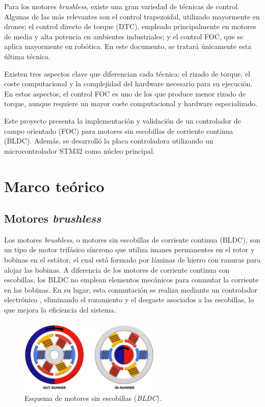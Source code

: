 \documentclass[11pt]{report}
\begin{document}
Para los motores \textit{brushless}, existe una gran variedad de técnicas de control. Algunas de las más relevantes son el control trapezoidal, utilizado mayormente en drones; el control directo de torque (DTC), empleado principalmente en motores de media y alta potencia en ambientes industriales; y el control FOC, que se aplica mayormente en robótica. En este documento, se tratará únicamente esta última técnica.

Existen tres aspectos clave que diferencian cada técnica: el rizado de torque, el coste computacional y la complejidad del hardware necesario para su ejecución. En estos aspectos, el control FOC es uno de los que produce menor rizado de torque, aunque requiere un mayor coste computacional y hardware especializado.

Este proyecto presenta la implementación y validación de un controlador de campo orientado (FOC) para motores sin escobillas de corriente continua (BLDC). Además, se desarrolló la placa controladora utilizando un microcontrolador STM32 como núcleo principal.

\newpage
\section{Marco teórico}
\subsection{Motores \textit{brushless}}
Los motores \textit{brushless}, o motores sin escobillas de corriente continua (BLDC), son un tipo de motor trifásico síncrono que utiliza imanes permanentes en el rotor y bobinas en el estátor, el cual está formado por láminas de hierro con ranuras para alojar las bobinas. A diferencia de los motores de corriente continua con escobillas, los BLDC no emplean elementos mecánicos para conmutar la corriente en las bobinas. En su lugar, esta conmutación se realiza mediante un controlador electrónico \cite{frick2018bldc}, eliminando el rozamiento y el desgaste asociados a las escobillas, lo que mejora la eficiencia del sistema.

\begin{figure}[ht]
	\centering
	\includegraphics[width=0.6\textwidth]{imagenes/Motor/OUT_IN_BLDC_SF.png}
	\caption{Esquema de motores sin escobillas (\textit{BLDC}).}
	\label{fig:motor_sin_escobillas}
\end{figure}
\FloatBarrier
\end{document}
